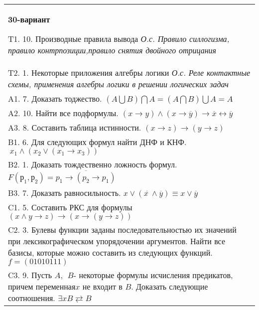 \documentclass{article}
\begin{document}
\begin{tabular}{m{17cm}}
\textbf{30-вариант}
\newline

T1. 10. Производные правила вывода \emph{О.с. Правило силлогизма, правило контрпозиции,правило снятия двойного отрицания} \\
T2. 1. Некоторые приложения алгебры логики \emph{О.с. Реле контактные схемы, применения алгебры логики в решении логических задач} \\
A1. 7. Доказать тоджество. \((A\bigcup B)\bigcap A = (A\bigcap B)\bigcup A = A\) \\
A2. 10. Найти все подформулы. \((x \rightarrow y) \land (x \rightarrow \overline{y}) \rightarrow \overline{x} \leftrightarrow \overline{y}\) \\
A3. 8. Составить таблица истинности. \((x \rightarrow z) \rightarrow (y \rightarrow z)\) \\
B1. 6. Для следующих формул найти ДНФ и КНФ. \(\ x_{1} \land (x_{2} \vee (x_{1} \rightarrow x_{3}))\) \\
B2. 1. Доказать тождественно ложность формул. \(F\left( р_{1},р_{2} \right) = \overline{p_{1} \rightarrow (p_{2} \rightarrow p_{1})}\) \\
B3. 7. Доказать равносильность. \(x \vee \left( \overline{x\ } \land \overline{y} \right) \equiv x \vee \overline{y}\) \\
C1. 5. Составить РКС для формулы \((x \land y \rightarrow z) \rightarrow (x \rightarrow (y \rightarrow z))\) \\
C2. 3. Булевы функции заданы последовательностью их значений при лексикографическом упорядочении аргументов. Найти все базисы, которые можно составить из следующих функций. \(f = (01010111)\) \\
C3. 9. Пусть \(A,\ \ B\)- некоторые формулы исчисления предикатов, причем переменная\(x\) не входит в \(B\). Доказать следующие соотношения. \(\exists xB \rightleftarrows B\)
 \\

\end{tabular}
\vspace{1cm}
\end{document}
